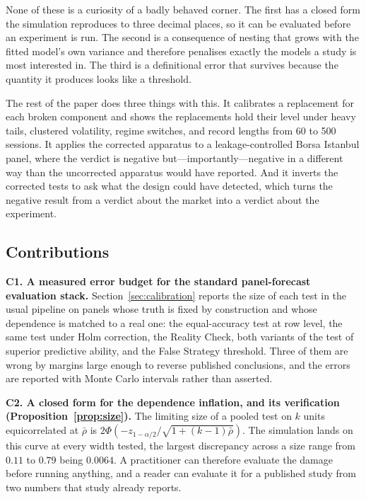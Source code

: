 \documentclass{article}
\theoremstyle{plain}
\theoremstyle{remark}
\begin{document}
None of these is a curiosity of a badly behaved corner. The first has a closed
form the simulation reproduces to three decimal places, so it can be evaluated
before an experiment is run. The second is a consequence of nesting that grows
with the fitted model's own variance and therefore penalises exactly the models
a study is most interested in. The third is a definitional error that survives
because the quantity it produces looks like a threshold.

The rest of the paper does three things with this. It calibrates a replacement
for each broken component and shows the replacements hold their level under
heavy tails, clustered volatility, regime switches, and record lengths from 60
to 500 sessions. It applies the corrected apparatus to a leakage-controlled
Borsa Istanbul panel, where the verdict is negative but---importantly---negative
in a different way than the uncorrected apparatus would have reported. And it
inverts the corrected tests to ask what the design could have detected, which
turns the negative result from a verdict about the market into a verdict about
the experiment.

\subsection*{Contributions}

\textbf{C1. A measured error budget for the standard panel-forecast evaluation
stack.} Section~\ref{sec:calibration} reports the size of each test in the
usual pipeline on panels whose truth is fixed by construction and whose
dependence is matched to a real one: the equal-accuracy test at row level, the
same test under Holm correction, the Reality Check, both variants of the test of
superior predictive ability, and the False Strategy threshold. Three of them are
wrong by margins large enough to reverse published conclusions, and the errors
are reported with Monte Carlo intervals rather than asserted.

\textbf{C2. A closed form for the dependence inflation, and its verification
(Proposition~\ref{prop:size}).} The limiting size of a pooled test on $k$ units
equicorrelated at $\bar\rho$ is
$2\Phi(-z_{1-\alpha/2}/\sqrt{1+(k-1)\bar\rho})$. The simulation lands on this
curve at every width tested, the largest discrepancy across a size range from
$0.11$ to $0.79$ being $0.0064$. A practitioner can therefore evaluate the
damage before running anything, and a reader can evaluate it for a published
study from two numbers that study already reports.
\end{document}
